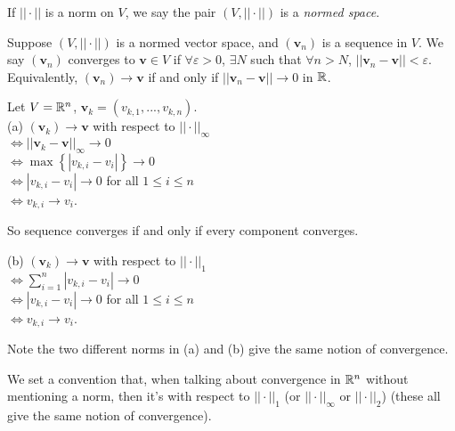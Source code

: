 \documentclass[a4paper]{article}
\begin{document}
\begin{notation}
If $||\cdot||$ is a norm on $V$, we say the pair $\left(V,||\cdot||\right)$ is a \emph{normed space}.
\end{notation}

\begin{defi}
Suppose $\left(V,||\cdot||\right)$ is a normed vector space, and $\left(\mathbf{v}_n\right)$ is a sequence in $V$. We say $\left(\mathbf{v}_n\right)$ converges to $\mathbf{v} \in V$ if $\forall \varepsilon > 0$, $\exists N$ such that $\forall n>N$, $||\mathbf{v}_n - \mathbf{v}|| < \varepsilon$.\\
Equivalently, $\left(\mathbf{v}_n\right) \to \mathbf{v}$ if and only if $||\mathbf{v}_n-\mathbf{v}|| \to 0$ in $\mathbb{R}$.
\end{defi}

\begin{eg}
Let $V=\mathbb{R}^n$, $\mathbf{v}_k = \left(v_{k,1},...,v_{k,n}\right)$.\\
(a) $\left(\mathbf{v}_k\right) \to \mathbf{v}$ with respect to $||\cdot||_\infty$\\
$\iff ||\mathbf{v}_k-\mathbf{v}||_\infty \to 0$\\
$\iff \max \left\{| v_{k,i} - v_i|\right\} \to 0$\\
$\iff |v_{k,i} - v_i| \to 0$ for all $1\leq i \leq n$\\
$\iff v_{k,i} \to v_i$.

So sequence converges if and only if every component converges.

(b) $\left(\mathbf{v}_k\right)\to \mathbf{v}$ with respect to $||\cdot||_1$\\
$\iff \sum_{i=1}^n |v_{k,i}-v_i| \to 0$\\
$\iff |v_{k,i} - v_i| \to 0$ for all $1\leq i \leq n$\\
$\iff v_{k,i} \to v_i$.

Note the two different norms in (a) and (b) give the same notion of convergence.

We set a convention that, when talking about convergence in $\mathbb{R}^n$ without mentioning a norm, then it's with respect to $||\cdot||_1$ (or $||\cdot||_\infty$ or $||\cdot||_2$) (these all give the same notion of convergence).
\end{eg}
\end{document}

